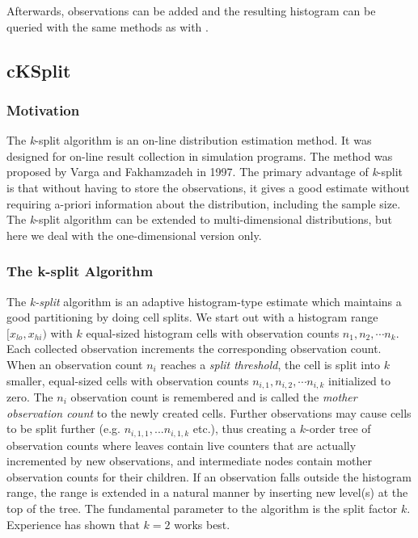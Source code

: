 Afterwards, observations can be added and the resulting histogram
can be queried with the same  methods
as with .


\subsection{cKSplit}
\label{sec:sim-lib:ksplit}

\subsubsection{Motivation}
\label{sec:sim-lib:ksplit-purpose}

The \textit{k}-split algorithm is an on-line distribution
estimation method.  It was
designed for on-line result collection in simulation programs.  The
method was proposed by Varga and Fakhamzadeh in 1997. The primary
advantage of \textit{k}-split is that without having to store the
observations, it gives a good estimate without requiring a-priori
information about the distribution, including the sample size. The
\textit{k}-split algorithm can be extended to multi-dimensional
distributions, but here we deal
with the one-dimensional version only.


\subsubsection{The k-split Algorithm}
\label{sec:sim-lib:ksplit-algorithm}

The \textit{k-split} algorithm is an adaptive histogram-type estimate which
maintains a good partitioning by doing cell splits. We start out with
a histogram range $[x_{lo}, x_{hi})$ with $k$ equal-sized histogram
cells with observation counts $n_1,n_2, \cdots n_k$.  Each collected
observation increments the corresponding observation count. When an
observation count $n_i$ reaches a \textit{split threshold}, the cell
is split into $k$ smaller, equal-sized cells with observation counts
$n_{i,1}, n_{i,2}, \cdots n_{i,k}$ initialized to zero. The $n_i$
observation count is remembered and is called the \textit{mother
  observation count} to the newly created cells. Further observations
may cause cells to be split further (e.g. $n_{i,1,1},...n_{i,1,k}$
etc.), thus creating a $k$-order tree of observation counts where
leaves contain live counters that are actually incremented by new
observations, and intermediate nodes contain mother observation counts
for their children. If an observation falls outside the histogram
range, the range is extended in a natural manner by inserting new
level(s) at the top of the tree. The fundamental parameter to the
algorithm is the split factor $k$. Experience has shown that $k=2$
works best.

